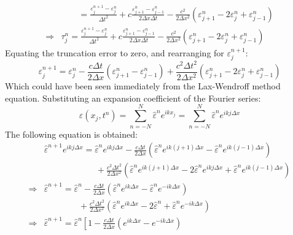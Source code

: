 \documentclass[12pt,a4]{article}
\begin{document}
\begin{enumerate}
\begin{enumerate}
\begin{align*}
                      &  \qquad = \frac{\varepsilon^{n+1}_j - \varepsilon^n_j}{\Delta t^2} + c \frac{\varepsilon^{n}_{j + 1} - \varepsilon^{n}_{j - 1}}{2 \Delta x \Delta t} - \frac{c^2 }{2 \Delta x^2}(\varepsilon^n_{j + 1} - 2 \varepsilon^n_j + \varepsilon^n_{j-1})\\
          \Rightarrow &  \tau^n_j = \frac{\varepsilon^{n+1}_j - \varepsilon^n_j}{\Delta t^2} + c \frac{\varepsilon^{n}_{j + 1} - \varepsilon^{n}_{j - 1}}{2 \Delta x \Delta t} - \frac{c^2 }{2 \Delta x^2}(\varepsilon^n_{j + 1} - 2 \varepsilon^n_j + \varepsilon^n_{j-1})
        \end{align*}
        Equating the truncation error to zero, and rearranging for $\varepsilon^{n+1}_j$:
        \begin{equation*}
          \varepsilon^{n+1}_j = \varepsilon^n_j - \frac{c \Delta t}{2 \Delta x } (\varepsilon^{n}_{j + 1} - \varepsilon^{n}_{j - 1})+ \frac{c^2 \Delta t^2}{2 \Delta x^2}(\varepsilon^n_{j + 1} - 2 \varepsilon^n_j + \varepsilon^n_{j-1})
        \end{equation*}
        Which could have been seen immediately from the Lax-Wendroff method equation.
        Substituting an expansion coefficient of the Fourier series:
        \begin{equation*}
            \varepsilon (x_j, t^n) = \sum_{n = -N}^N \hat \varepsilon^n e^{ikx_j} = \sum_{n = -N}^N \hat \varepsilon^n e^{ikj \Delta x}
        \end{equation*}
        The following equation is obtained:
        \begin{align*}
                      & \hat \varepsilon^{n + 1}e^{i k j\Delta x} = \hat \varepsilon^ne^{ikj\Delta x} - \frac{c \Delta t}{2 \Delta x } (\hat\varepsilon^{n}e^{ik(j + 1)\Delta x} - \hat \varepsilon^{n}e^{ik(j - 1)\Delta x}) \\
                      & \qquad \qquad \qquad + \frac{c^2 \Delta t^2}{2 \Delta x^2}(\hat \varepsilon^ne^{ik(j + 1)\Delta x} - 2 \hat \varepsilon^ne^{ikj\Delta x} + \hat \varepsilon^ne^{ik(j-1)\Delta x}) \\
          \Rightarrow & \hat \varepsilon^{n + 1} = \hat \varepsilon^n - \frac{c \Delta t}{2 \Delta x } (\hat\varepsilon^{n}e^{ik\Delta x} - \hat \varepsilon^{n}e^{-ik\Delta x}) \\
                      & \qquad \qquad + \frac{c^2 \Delta t^2}{2 \Delta x^2}(\hat \varepsilon^ne^{ik\Delta x} - 2 \hat \varepsilon^n + \hat \varepsilon^ne^{-ik\Delta x}) \\
          \Rightarrow & \hat \varepsilon^{n + 1} = \hat \varepsilon^n\left[1  - \frac{c \Delta t}{2 \Delta x } (e^{ik\Delta x} - e^{-ik\Delta x})\right. \\

\end{align*}
\end{enumerate}
\end{enumerate}
\end{document}
